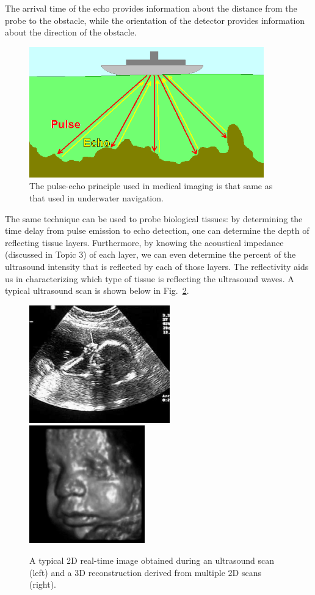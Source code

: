 The arrival time of the echo provides information about the distance from the probe to the obstacle, while the orientation of the detector provides information about the direction of the obstacle.
\begin{figure}[!htb]
	\centering
	\includegraphics[width=4.0in]{./figures/Topic10/Fig10-3.png}
	\caption{The pulse-echo principle used in medical imaging is that same as that used in underwater navigation.}
	\label{Fig10-3}
\end{figure} 
The same technique can be used to probe biological tissues: by determining the time delay from pulse emission to echo detection, one can determine the depth of reflecting tissue layers. Furthermore, by knowing the acoustical impedance (discussed in Topic 3) of each layer, we can even determine the percent of the ultrasound intensity that is reflected by each of those layers. The reflectivity aids us in characterizing which type of tissue is reflecting the ultrasound waves. A typical ultrasound scan is shown below in Fig.~\ref{Fig10-4}. 
\begin{figure}[!htb]
	\centering
	\includegraphics[height=2.0in]{./figures/Topic10/Fig10-4a.jpg}
	\includegraphics[height=2.0in]{./figures/Topic10/Fig10-4b.jpg}
	\caption{A typical 2D real-time image obtained during an ultrasound scan (left) and a 3D reconstruction derived from multiple 2D scans (right).}
	\label{Fig10-4}
\end{figure} 

